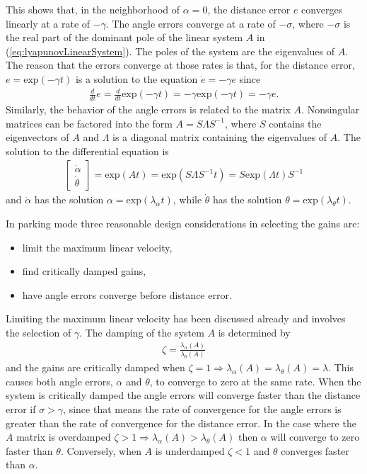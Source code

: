 This shows that, in the neighborhood of $\alpha=0$, the distance error $e$ converges linearly at a rate of $-\gamma$. The angle errors converge at a rate of $-\sigma$, where $-\sigma$ is the real part of the dominant pole of the linear system $A$ in (\ref{eq:lyapunovLinearSystem}). The poles of the system are the eigenvalues of $A$. The reason that the errors converge at those rates is that, for the distance error, $e=\text{exp}(-\gamma t)$ is a solution to the equation $\dot{e}=-\gamma e$ since 
\begin{align*}
\tfrac{d}{dt}e=\tfrac{d}{dt}\text{exp}(-\gamma t) = -\gamma \text{exp}(-\gamma t)=-\gamma e.
\end{align*}
Similarly, the behavior of the angle errors is related to the matrix $A$. Nonsingular matrices can be factored into the form $A=S\Lambda S^{-1}$, where $S$ contains the eigenvectors of $A$ and $\Lambda$ is a diagonal matrix containing the eigenvalues of $A$. The solution to the differential equation is
\begin{align*}
\left[\begin{array}{c} \dot{\alpha} \\ \dot{\theta} \end{array}\right] = \text{exp}(At)=\text{exp}(S\Lambda S^{-1}t)=S\text{exp}(\Lambda t)S^{-1}
\end{align*}
and $\dot{\alpha}$ has the solution $\alpha=\text{exp}(\lambda_\alpha t)$, while $\dot{\theta}$ has the solution $\theta=\text{exp}(\lambda_\theta t)$.

In parking mode three reasonable design considerations in selecting the gains are:
\begin{itemize}
\item limit the maximum linear velocity,
\item find critically damped gains,
\item have angle errors converge before distance error.
\end{itemize}
Limiting the maximum linear velocity has been discussed already and involves the selection of $\gamma$. The damping of the system $A$ is determined by
\begin{align*}
\zeta = \frac{\lambda_\alpha(A)}{\lambda_\theta(A)}
\end{align*}
and the gains are critically damped when $\zeta = 1 \Rightarrow \lambda_\alpha(A)=\lambda_\theta(A)=\lambda$. This causes both angle errors, $\alpha$ and $\theta$, to converge to zero at the same rate. When the system is critically damped the angle errors will converge faster than the distance error if $\sigma>\gamma$, since that means the rate of convergence for the angle errors is greater than the rate of convergence for the distance error. In the case where the $A$ matrix is overdamped $\zeta > 1 \Rightarrow \lambda_\alpha(A) > \lambda_\theta(A)$ then $\alpha$ will converge to zero faster than $\theta$. Conversely, when $A$ is underdamped $\zeta < 1$ and $\theta$ converges faster than $\alpha$.

